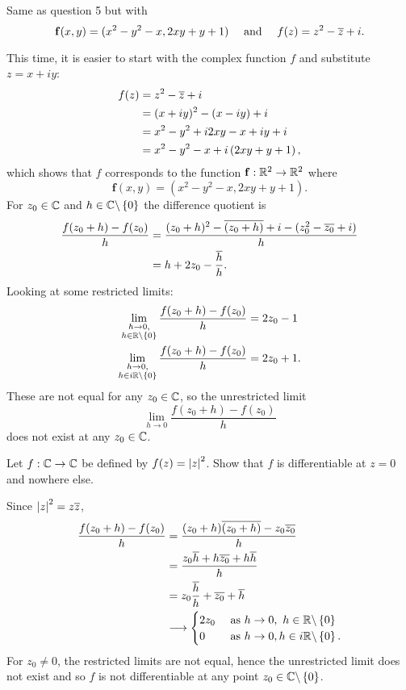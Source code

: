 \begin{questions}
\begin{answer}
\end{answer}
\question Same as question 5 but with
\[
\mathbf{f}(x,y)=(x^2-y^2-x,2xy+y+1) \quad\text{ and }\quad f(z)=z^2-\overline{z}+i.
\]
\begin{answer}
This time, it is easier to start with the complex function $f$ and substitute $z=x+iy$:
\begin{align*}
f(z) & = z^2-\overline{z} + i \\
& = (x+iy)^2-(x-iy)+i \\
& = x^2-y^2+i2xy -x +iy +i \\
& = x^2-y^2-x + i \left( 2xy+y+1 \right),
\end{align*}
which shows that $f$ corresponds to the function $\mathbf{f}:\mathbb{R}^2 \to \mathbb{R}^2$ where
\[
\mathbf{f} (x,y) = \left( x^2-y^2-x, 2xy+y+1 \right).
\]
For $z_0 \in \mathbb{C}$ and $h \in \mathbb{C} \backslash \left\{0\right\}$ the difference quotient is
\begin{align*}
\frac{f(z_0+h)-f(z_0)}{h} & = \frac{(z_0+h)^2-\overline{(z_0+h)}+i-(z_0^2-\overline{z_0}+i )}{h} \\
& = h+2z_0-\frac{\overline{h}}{h}.
\end{align*}
Looking at some restricted limits:
\begin{align*}
\lim_{\substack{h \to 0, \\ h \in \mathbb{R} \backslash \left\{0\right\}}} \frac{f(z_0+h)-f(z_0)}{h} & = 2z_0-1 \\
\lim_{\substack{h \to 0, \\ h \in i\mathbb{R} \backslash \left\{0\right\}}} \frac{f(z_0+h)-f(z_0)}{h} & = 2z_0+1. \\
\end{align*}
These are not equal for any $z_0 \in \mathbb{C}$, so the unrestricted limit
\[
\lim_{h \to 0} \frac{f(z_0+h)-f(z_0)}{h}
\]
does not exist at any $z_0 \in \mathbb{C}$. 
\end{answer}
\question Let $f:\mathbb{C} \to \mathbb{C}$ be defined by $f(z) = \left| z \right|^2$.  Show that $f$ is differentiable at $z=0$ and nowhere else.
\begin{answer}
Since $\left| z \right|^2 = z \overline{z}$,
\begin{align*}
\frac{f(z_0+h)-f(z_0)}{h} &= \frac{(z_0+h)\overline{(z_0+h)}-z_0\overline{z_0}}{h} \\
& = \frac{z_0\overline{h}+h\overline{z_0}+h\overline{h}}{h} \\
&= z_0\frac{\overline{h}}{h} + \overline{z_0}+\overline{h} \\
& \longrightarrow
\begin{cases}
2z_0 & \text{ as }h \to 0,\ h \in \mathbb{R} \backslash \left\{0\right\} \\
0 & \text{ as } h \to 0, h \in i\mathbb{R} \backslash \left\{0\right\}.
\end{cases}
\end{align*}
For $z_0 \neq 0$, the restricted limits are not equal, hence the unrestricted limit does not exist and so $f$ is not differentiable at any point $z_0 \in \mathbb{C} \backslash \left\{0\right\}$.


\end{answer}
\end{questions}

